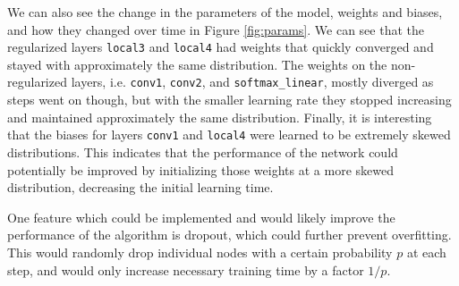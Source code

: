 \documentclass[11pt, twocolumn, twoside]{article}
\begin{document}
We can also see the change in the parameters of the model, weights and biases, and how they changed over time in Figure \ref{fig:params}. We can see that the regularized layers \texttt{local3} and \texttt{local4} had weights that quickly converged and stayed with approximately the same distribution. The weights on the non-regularized layers, i.e. \texttt{conv1}, \texttt{conv2}, and \texttt{softmax\_linear}, mostly diverged as steps went on though, but with the smaller learning rate they stopped increasing and maintained approximately the same distribution. Finally, it is interesting that the biases for layers \texttt{conv1} and \texttt{local4} were learned to be extremely skewed distributions. This indicates that the performance of the network could potentially be improved by initializing those weights at a more skewed distribution, decreasing the initial learning time.

One feature which could be implemented and would likely improve the performance of the algorithm is dropout, which could further prevent overfitting. This would randomly drop individual nodes with a certain probability $p$ at each step, and would only increase necessary training time by a factor $1/p$.
\end{document}
